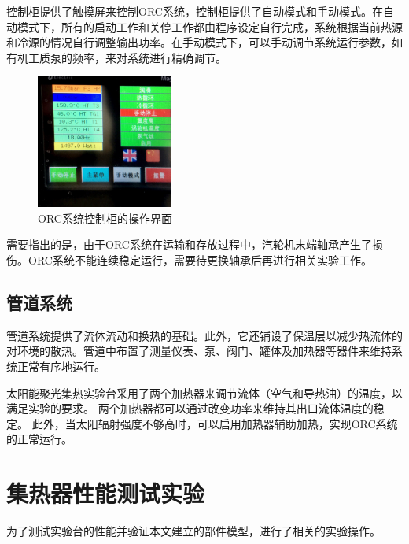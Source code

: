 控制柜提供了触摸屏来控制ORC系统，控制柜提供了自动模式和手动模式。在自动模式下，所有的启动工作和关停工作都由程序设定自行完成，系统根据当前热源和冷源的情况自行调整输出功率。在手动模式下，可以手动调节系统运行参数，如有机工质泵的频率，来对系统进行精确调节。

\begin{figure}[!ht]
\centering
\includegraphics[width=0.4\textwidth]{fig/ControlCabinet}
\caption{ORC系统控制柜的操作界面}\label{fig:ControlCabinet}
\end{figure}

需要指出的是，由于ORC系统在运输和存放过程中，汽轮机末端轴承产生了损伤。ORC系统不能连续稳定运行，需要待更换轴承后再进行相关实验工作。

\subsection{管道系统}

管道系统提供了流体流动和换热的基础。此外，它还铺设了保温层以减少热流体的对环境的散热。管道中布置了测量仪表、泵、阀门、罐体及加热器等器件来维持系统正常有序地运行。

太阳能聚光集热实验台采用了两个加热器来调节流体（空气和导热油）的温度，以满足实验的要求。
两个加热器都可以通过改变功率来维持其出口流体温度的稳定。
此外，当太阳辐射强度不够高时，可以启用加热器辅助加热，实现ORC系统的正常运行。

\section{集热器性能测试实验}

为了测试实验台的性能并验证本文建立的部件模型，进行了相关的实验操作。

